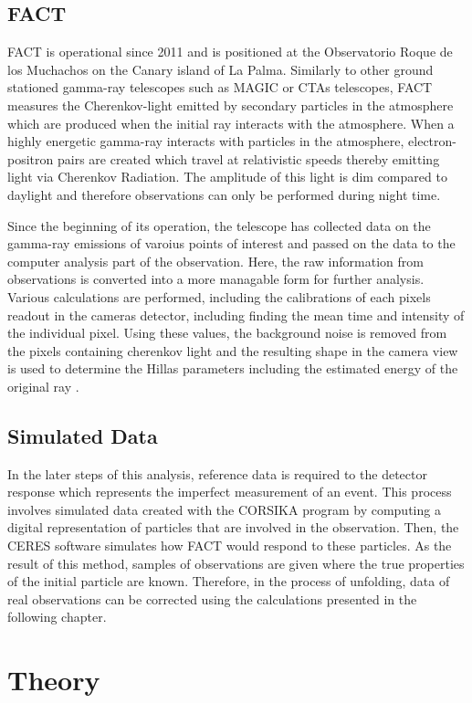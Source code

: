 \subsection{FACT}
FACT is operational since 2011 and is positioned at the Observatorio Roque de los Muchachos on the Canary island of La Palma.    
Similarly to other ground stationed gamma-ray telescopes such as MAGIC or CTAs telescopes, FACT measures the Cherenkov-light emitted by secondary particles in the atmosphere which are produced when the initial ray interacts with the atmosphere.
When a highly energetic gamma-ray interacts with particles in the atmosphere, electron-positron pairs are created which travel at relativistic speeds thereby emitting light via Cherenkov Radiation.
The amplitude of this light is dim compared to daylight and therefore observations can only be performed during night time.

Since the beginning of its operation, the telescope has collected data on the gamma-ray emissions of varoius points of interest and passed on the data to the computer analysis part of the observation.
Here, the raw information from observations is converted into a more managable form for further analysis.
Various calculations are performed, including the calibrations of each pixels readout in the cameras detector, including finding the mean time and intensity of the individual pixel.
Using these values, the background noise is removed from the pixels containing cherenkov light and the resulting shape in the camera view is used to determine the Hillas parameters including the estimated energy of the original ray \cite{FACT4} \cite{FACT5}.

\subsection{Simulated Data}
In the later steps of this analysis, reference data is required to the detector response which represents the imperfect measurement of an event.
This process involves simulated data created with the CORSIKA program \cite{corsika} by computing a digital representation of particles that are involved in the observation.
Then, the CERES software simulates how FACT would respond to these particles.
As the result of this method, samples of observations are given where the true properties of the initial particle are known.
Therefore, in the process of unfolding, data of real observations can be corrected using the calculations presented in the following chapter. 
    \section{Theory}

